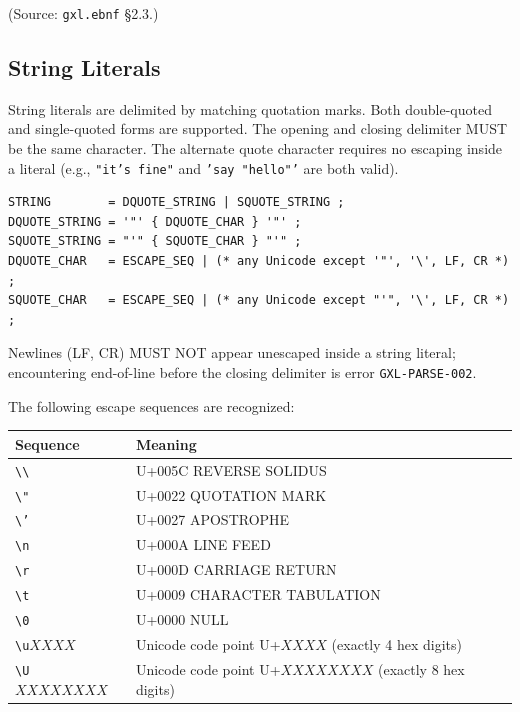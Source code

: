 (Source: \texttt{gxl.ebnf} \S2.3.)

\subsection{String Literals}
\label{subsec:gxl:strings}

String literals are delimited by matching quotation marks.
Both double-quoted and single-quoted forms are supported.
The opening and closing delimiter MUST be the same character.
The alternate quote character requires no escaping inside a literal
(e.g., \texttt{"it's fine"} and \texttt{'say "hello"'} are both valid).

\begin{verbatim}
STRING        = DQUOTE_STRING | SQUOTE_STRING ;
DQUOTE_STRING = '"' { DQUOTE_CHAR } '"' ;
SQUOTE_STRING = "'" { SQUOTE_CHAR } "'" ;
DQUOTE_CHAR   = ESCAPE_SEQ | (* any Unicode except '"', '\', LF, CR *) ;
SQUOTE_CHAR   = ESCAPE_SEQ | (* any Unicode except "'", '\', LF, CR *) ;
\end{verbatim}

\noindent Newlines (LF, CR) MUST NOT appear unescaped inside a string literal;
encountering end-of-line before the closing delimiter is error
\texttt{GXL-PARSE-002}.

The following escape sequences are recognized:

\begin{center}
\begin{tabular}{ll}
\hline
\textbf{Sequence} & \textbf{Meaning} \\
\hline
\texttt{\textbackslash\textbackslash} & U+005C REVERSE SOLIDUS \\
\texttt{\textbackslash"} & U+0022 QUOTATION MARK \\
\texttt{\textbackslash'} & U+0027 APOSTROPHE \\
\texttt{\textbackslash n} & U+000A LINE FEED \\
\texttt{\textbackslash r} & U+000D CARRIAGE RETURN \\
\texttt{\textbackslash t} & U+0009 CHARACTER TABULATION \\
\texttt{\textbackslash 0} & U+0000 NULL \\
\texttt{\textbackslash u}$XXXX$ & Unicode code point U+$XXXX$ (exactly 4 hex digits) \\
\texttt{\textbackslash U}$XXXXXXXX$ & Unicode code point U+$XXXXXXXX$ (exactly 8 hex digits) \\
\hline
\end{tabular}
\end{center}

